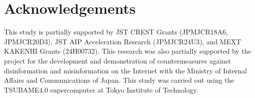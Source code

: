 \documentclass[english]{lni}
\begin{document}
\section*{Acknowledgements}

This study is partially supported by JST CREST Grants (JPMJCR18A6, JPMJCR20D3), JST AIP Acceleration Research (JPMJCR24U3), and MEXT KAKENHI Grants (24H00732). This research was also partially supported by the project for the development and demonstration of countermeasures against disinformation and misinformation on the Internet with the Ministry of Internal Affairs and Communications of Japan. This study was carried out using the TSUBAME4.0 supercomputer at Tokyo Institute of Technology.
\\
\\
\\
\\
% 

\end{document}

